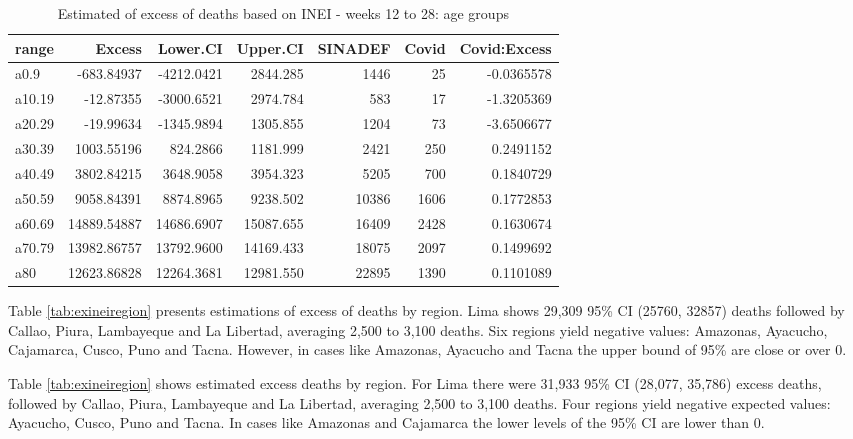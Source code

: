\documentclass[
]{article}
\begin{document}
\begin{table}[!h]

\caption{\label{tab:exineiage}Estimated of excess of deaths based on INEI - weeks 12 to 28: age groups}
\centering
\begin{tabular}[t]{lrrrrrr}
\toprule
range & Excess & Lower.CI & Upper.CI & SINADEF & Covid & Covid:Excess\\
\midrule
a0.9 & -683.84937 & -4212.0421 & 2844.285 & 1446 & 25 & -0.0365578\\
a10.19 & -12.87355 & -3000.6521 & 2974.784 & 583 & 17 & -1.3205369\\
a20.29 & -19.99634 & -1345.9894 & 1305.855 & 1204 & 73 & -3.6506677\\
a30.39 & 1003.55196 & 824.2866 & 1181.999 & 2421 & 250 & 0.2491152\\
a40.49 & 3802.84215 & 3648.9058 & 3954.323 & 5205 & 700 & 0.1840729\\
\addlinespace
a50.59 & 9058.84391 & 8874.8965 & 9238.502 & 10386 & 1606 & 0.1772853\\
a60.69 & 14889.54887 & 14686.6907 & 15087.655 & 16409 & 2428 & 0.1630674\\
a70.79 & 13982.86757 & 13792.9600 & 14169.433 & 18075 & 2097 & 0.1499692\\
a80 & 12623.86828 & 12264.3681 & 12981.550 & 22895 & 1390 & 0.1101089\\
\bottomrule
\end{tabular}
\end{table}

Table \ref{tab:exineiregion} presents estimations of excess of deaths by region. Lima shows 29,309 95\% CI (25760, 32857) deaths followed by Callao, Piura, Lambayeque and La Libertad, averaging 2,500 to 3,100 deaths. Six regions yield negative values: Amazonas, Ayacucho, Cajamarca, Cusco, Puno and Tacna. However, in cases like Amazonas, Ayacucho and Tacna the upper bound of 95\% are close or over 0.

Table \ref{tab:exineiregion} shows estimated excess deaths by region. For Lima there were 31,933 95\% CI (28,077, 35,786) excess deaths, followed by Callao, Piura, Lambayeque and La Libertad, averaging 2,500 to 3,100 deaths. Four regions yield negative expected values: Ayacucho, Cusco, Puno and Tacna. In cases like Amazonas and Cajamarca the lower levels of the 95\% CI are lower than 0.
\end{document}
